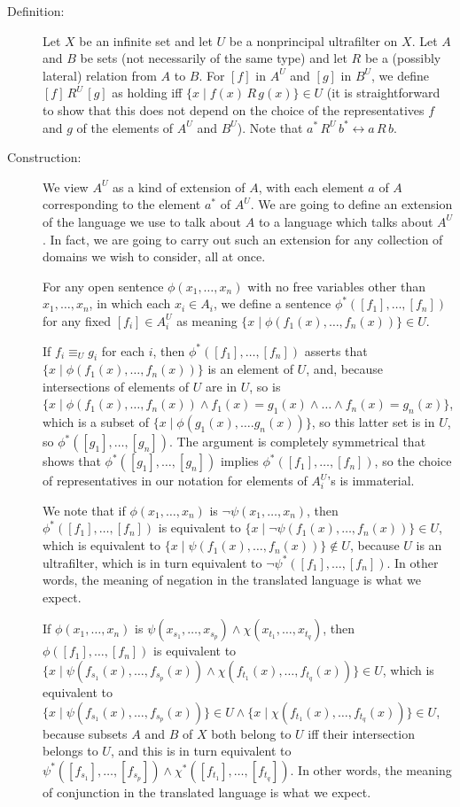 \documentclass[12pt]{book}
\begin{document}
\begin{description}
\item[Definition:]  Let $X$ be an infinite set and let $U$ be a nonprincipal ultrafilter on $X$.  Let $A$ and $B$ be sets (not necessarily of the same
type) and let $R$ be a (possibly lateral) relation from $A$ to $B$.  For $[f]$ in $A^U$ and $[g]$ in $B^U$, we define $[f]\,R^U\,[g]$ as holding
iff $\{x \mid f(x)\,R\,g(x)\} \in U$ (it is straightforward to show that this does not depend on the choice of the representatives $f$ and $g$ of the elements of $A^U$ and $B^U$).   Note that $a^* \,R^U \,b^* \leftrightarrow a\,R\,b$.

\item[Construction:]  We view $A^U$ as a kind of extension of $A$, with each element $a$ of $A$ corresponding to the element $a^*$ of $A^U$.
We are going to define an extension of the language we use to talk about $A$ to a language which talks about $A^U$.  In fact, we are
going to carry out such an extension for any collection of domains we wish to consider, all at once.

For any open sentence $\phi(x_1,\ldots,x_n)$ with no free variables other than $x_1,\ldots,x_n$, in which each $x_i \in A_i$,
we define a sentence $\phi^*([f_1],\ldots,[f_n])$ for any fixed $[f_i]\in A_i^U$ as meaning $\{x \mid \phi(f_1(x),\ldots,f_n(x))\} \in U$.

If $f_i \equiv_U g_i$ for each $i$, then $\phi^*([f_1],\ldots,[f_n])$ asserts that $\{x \mid \phi(f_1(x),\ldots,f_n(x))\}$ is an element of $U$,
and, because intersections of elements of $U$ are in $U$, so is $\{x \mid \phi(f_1(x),\ldots,f_n(x)) \wedge f_1(x)=g_1(x) \wedge \ldots \wedge f_n(x)=g_n(x)\}$, which is a subset of $\{x \mid \phi(g_1(x),\ldots.g_n(x))\}$, so this latter set is in $U$, so $\phi^*([g_1],\ldots,[g_n])$.  The argument is completely symmetrical that shows that $\phi^*([g_1],\ldots,[g_n])$ implies $\phi^*([f_1],\ldots,[f_n])$, so the choice of representatives in
our notation for elements of $A_i^U$'s is immaterial.

We note that if $\phi(x_1,\ldots,x_n)$ is $\neg\psi(x_1,\ldots,x_n)$, then $\phi^*([f_1],\ldots,[f_n])$ is equivalent to $\{x \mid \neg\psi(f_1(x),\ldots,f_n(x))\} \in U$, which is equivalent to $\{x \mid \psi(f_1(x),\ldots,f_n(x))\} \not\in U$, because $U$ is an ultrafilter, which is in turn equivalent to
$\neg \psi^*([f_1],\ldots,[f_n])$.  In other words, the meaning of negation in the translated language is what we expect.

If $\phi(x_1,\ldots,x_n)$ is $\psi(x_{s_1},\ldots,x_{s_p}) \wedge \chi(x_{t_1},\ldots,x_{t_q})$, then $\phi([f_1],\ldots,[f_n])$ is equivalent to
$\{x \mid \psi(f_{s_1}(x),\ldots,f_{s_p}(x)) \wedge \chi(f_{t_1}(x),\ldots,f_{t_q}(x))\} \in U$, which is equivalent to $\{x \mid \psi(f_{s_1}(x),\ldots,f_{s_p}(x))\} \in U \wedge \{x \mid \chi(f_{t_1}(x),\ldots,f_{t_q}(x))\} \in U$, because subsets $A$ and $B$ of $X$ both belong to $U$ iff their intersection belongs to $U$, and this is in turn equivalent to $\psi^*([f_{s_1}],\ldots,[f_{s_p}]) \wedge \chi^*([f_{t_1}],\ldots,[f_{t_q}])$.  In other words, the meaning
of conjunction in the translated language is what we expect.


\end{description}
\end{document}
